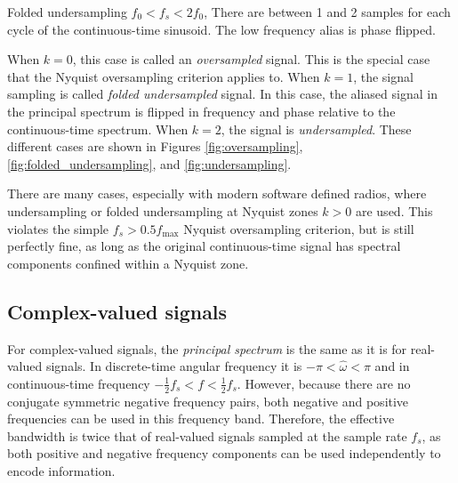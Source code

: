 \begin{marginfigure}
\begin{center}
  \end{center}
  \caption{Folded undersampling $f_{0} < f_s < 2 f_0$, There are between 1 and 2 samples for each cycle of the continuous-time sinusoid. The low frequency alias is phase flipped.}
  \label{fig:folded_undersampling}
\end{marginfigure}

When $k=0$, this case is called an \emph{oversampled} signal. This is the special case that 
the Nyquist oversampling criterion applies to. When $k = 1$, the signal sampling is 
called \emph{folded undersampled} signal. In this case, the aliased signal 
in the principal spectrum is flipped in frequency and phase relative to the 
continuous-time spectrum. When $k=2$, the signal is \emph{undersampled}. 
These different cases are shown in Figures \ref{fig:oversampling}, 
\ref{fig:folded_undersampling}, and \ref{fig:undersampling}.

There are many cases, especially with modern software defined radios, 
where undersampling or folded undersampling at Nyquist zones $k>0$ are used. 
This violates the simple $f_s > 0.5 f_{\mathrm{max}}$ Nyquist oversampling criterion, 
but is still perfectly fine, as long as the original continuous-time signal has 
spectral components confined within a Nyquist zone.


\subsection{Complex-valued signals}
For complex-valued signals, the \emph{principal spectrum} is the same as it is for 
real-valued signals. In discrete-time angular frequency it is $-\pi<\hat{\omega}<\pi$ and 
in continuous-time frequency $-\frac{1}{2}f_s<f<\frac{1}{2}f_s$. However, because there 
are no conjugate symmetric negative frequency pairs, both negative and positive frequencies 
can be used in this frequency band. Therefore, the effective bandwidth is twice that of 
real-valued signals sampled at the sample rate $f_s$, as both positive and negative 
frequency components can be used independently to encode information.


